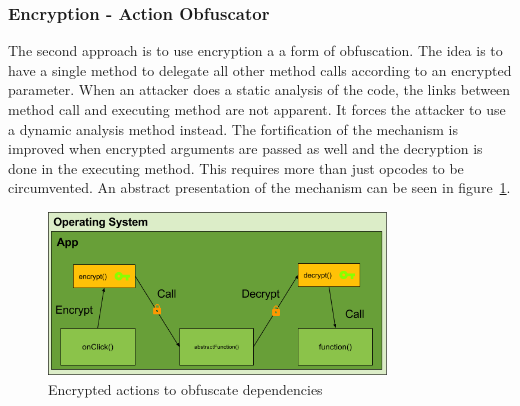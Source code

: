\subsubsection{Encryption - Action Obfuscator} \label{subsubsectionection:counter-replace-encryption-content-obfuscator}
The second approach is to use encryption a a form of obfuscation.
The idea is to have a single method to delegate all other method calls according to an encrypted parameter.
\newline
When an attacker does a static analysis of the code, the links between method call and executing method are not apparent.
It forces the attacker to use a dynamic analysis method instead.
The fortification of the mechanism is improved when encrypted arguments are passed as well and the decryption is done in the executing method.
This requires more than just opcodes to be circumvented.
\newline
An abstract presentation of the mechanism can be seen in figure~\ref{fig:encryptionAction}.
\begin{figure}[h]
    \centering
    \includegraphics[width=0.8\textwidth]{data/encryptionAction.png}
    \caption{Encrypted actions to obfuscate dependencies}
    \label{fig:encryptionAction}
\end{figure}


